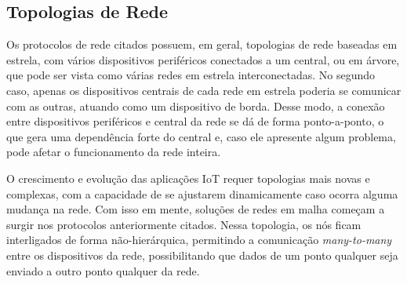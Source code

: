 \documentclass[../monografia.tex]{subfiles}
\begin{document}
 
\subsection{Topologias de Rede} \label{topologias-rede}

Os protocolos de rede citados possuem, em geral, topologias de rede baseadas em estrela, com vários dispositivos periféricos conectados a um central, ou em árvore, que pode ser vista como várias redes em estrela interconectadas. No segundo caso, apenas os dispositivos centrais de cada rede em estrela poderia se comunicar com as outras, atuando como um dispositivo de borda. Desse modo, a conexão entre dispositivos periféricos e central da rede se dá de forma ponto-a-ponto, o que gera uma dependência forte do central e, caso ele apresente algum problema, pode afetar o funcionamento da rede inteira.





O crescimento e evolução das aplicações IoT requer topologias mais novas e complexas, com a capacidade de se ajustarem dinamicamente caso ocorra alguma mudança na rede. Com isso em mente, soluções de redes em malha começam a surgir nos protocolos anteriormente citados. Nessa topologia, os nós ficam interligados de forma não-hierárquica, permitindo a comunicação \textit{many-to-many} entre os dispositivos da rede, possibilitando que dados de um ponto qualquer seja enviado a outro ponto qualquer da rede. 
\end{document}
